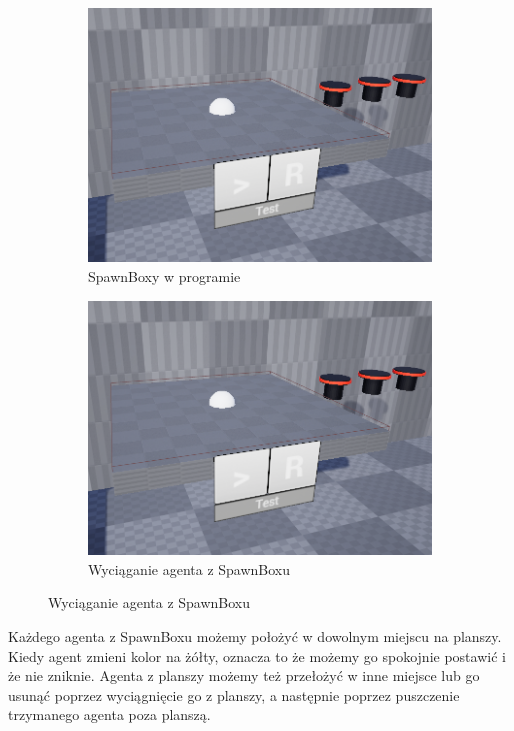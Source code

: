 \documentclass[a4paper,12pt,reqno]{article}
\begin{document}
\begin{figure}[H]%
	\centering
	\begin{subfigure}{.5\textwidth}
		\centering
		\includegraphics[width=0.8\linewidth]{graphics//agent/AgentInUE_1.png}
		\caption{SpawnBoxy w programie}	
		\label{ref:subref_a}
	\end{subfigure}%
	\begin{subfigure}{.5\textwidth}
		\centering
		\includegraphics[width=0.8\linewidth]{graphics//agent/AgentInUE_1.png}
		\caption{Wyciąganie agenta z SpawnBoxu}
		\label{ref:subref_b}
	\end{subfigure}%
\label{ref:ref}
\end{figure}

Każdego agenta z SpawnBoxu możemy położyć w dowolnym miejscu na planszy. Kiedy agent zmieni kolor na żółty, oznacza to że możemy go spokojnie postawić i że nie zniknie. Agenta z planszy możemy też przełożyć w inne miejsce lub go usunąć poprzez wyciągnięcie go z planszy, a następnie poprzez puszczenie trzymanego agenta poza planszą.
\end{document}

